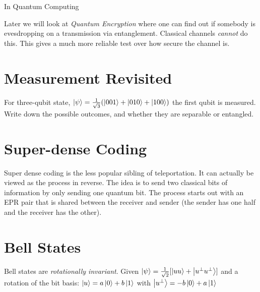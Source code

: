 In Quantum Computing

Later we will look at \textit{Quantum Encryption} where one can find out if somebody is 
evesdropping on a transmission via entanglement. Classical channels \textit{cannot} do this.
This gives a much more reliable test over how secure the channel is. 

\section{Measurement Revisited}


\begin{example}
For three-qubit state, $\left|\psi\right\rangle = \frac{1}{\sqrt{3}}(\left|001\right\rangle + \left|010\right\rangle + \left|100\right\rangle)$
the first qubit is measured. Write down the possible outcomes,
and whether they are separable or entangled.


\end{example}






\section{Super-dense Coding}

Super dense coding is the less popular sibling of teleportation. It can actually be viewed as the
process in reverse. The idea is to send two classical bits of information by only sending one
quantum bit. The process starts out with an EPR pair that is shared between the receiver and
sender (the sender has one half and the receiver has the other).


\section{Bell States}


Bell states are \textit{rotationally invariant}.
Given $\left|\psi\right\rangle = \frac{1}{\sqrt{2}} [\left|uu\right\rangle + \left|u^{\perp}u^{\perp}\right\rangle]$ 
and a rotation of the bit basis:
$\left|u\right\rangle = a\left|0\right\rangle + b\left|1\right\rangle$ with $\left|u^{\perp}\right\rangle = -b\left|0\right\rangle + a\left|1\right\rangle$




